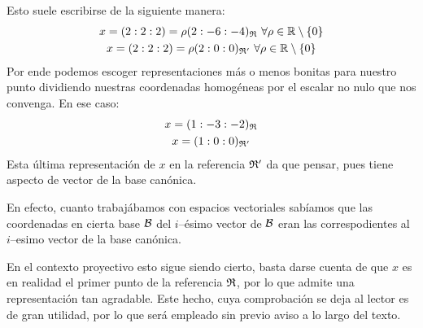 \begin{exa}
	Esto suele escribirse de la siguiente manera:
	\begin{gather*}
		x=(2:2:2)=\rho(2:-6:-4)_{\mathfrak{R}}\ \forall \rho\in\mathbb{R}\setminus\{0\}\\
		x=(2:2:2)=\rho(2:0:0)_{\mathfrak{R}'}\ \forall \rho\in\mathbb{R}\setminus\{0\}
	\end{gather*}
	Por ende podemos escoger representaciones más o menos bonitas para nuestro punto dividiendo nuestras coordenadas homogéneas por el escalar no nulo que nos convenga. En ese caso:
	\begin{gather*}
		x=(1:-3:-2)_{\mathfrak{R}}\\
		x=(1:0:0)_{\mathfrak{R}'}
	\end{gather*}
	Esta última representación de $x$ en la referencia $\mathfrak{R}'$ da que pensar, pues tiene aspecto de vector de la base canónica.
	
	 En efecto, cuanto trabajábamos con espacios vectoriales sabíamos que las coordenadas en cierta base $\mathcal{B}$ del $i$--ésimo vector de $\mathcal{B}$ eran las correspodientes al $i$--esimo vector de la base canónica.
	 
	 En el contexto proyectivo esto sigue siendo cierto, basta darse cuenta de que $x$ es en realidad el primer punto de la referencia $\mathfrak{R}$, por lo que admite una representación tan agradable. Este hecho, cuya comprobación se deja al lector es de gran utilidad, por lo que será empleado sin previo aviso a lo largo del texto. 
\end{exa}